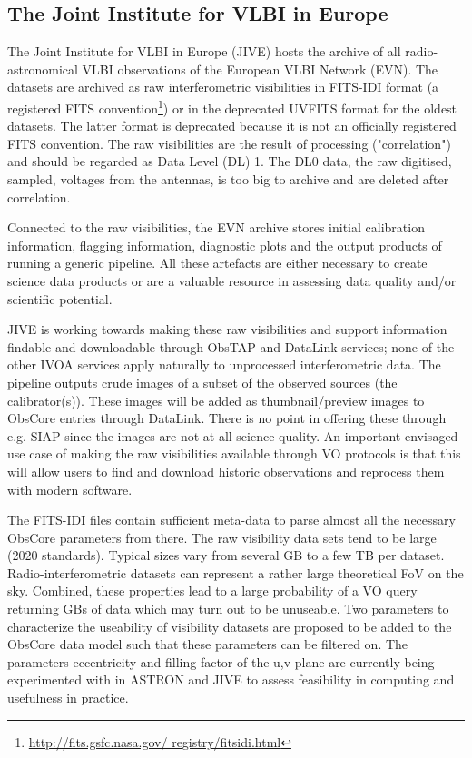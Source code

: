 \documentclass[11pt,a4paper]{ivoa}
\begin{document}
\subsection{The Joint Institute for VLBI in Europe}
\label{sec:JIVE}
The Joint Institute for VLBI in Europe (JIVE) hosts the archive of all radio-astronomical VLBI 
observations of the European VLBI Network (EVN). The datasets are archived as raw interferometric 
visibilities in FITS-IDI format (a registered FITS convention\footnote{\url{ http://fits.gsfc.nasa.gov/
registry/fitsidi.html}}) or in the deprecated UVFITS format for the oldest datasets. The latter format 
is deprecated because it is not an officially registered FITS convention. The raw visibilities are the 
result of processing ("correlation") and should be regarded as Data Level (DL) 1. The DL0 data, the raw 
digitised, sampled, voltages from the antennas, is too big to archive and are deleted after correlation.

Connected to the raw visibilities, the EVN archive stores initial calibration information, flagging 
information, diagnostic plots and the output products of running a generic pipeline. All these artefacts 
are either necessary to create science data products or are a valuable resource in assessing data 
quality and/or scientific potential.

JIVE is working towards making these raw visibilities and support information findable and downloadable 
through ObsTAP and DataLink services; none of the other IVOA services apply naturally to unprocessed 
interferometric data. The pipeline outputs crude images of a subset of the observed sources (the 
calibrator(s)). These images will be added as thumbnail/preview images to ObsCore entries through 
DataLink. There is no point in offering these through e.g. SIAP since the images are not at all science 
quality. An important envisaged use case of making the raw visibilities available through VO protocols 
is that this will allow users to find and download historic observations and reprocess them with modern 
software.

The FITS-IDI files contain sufficient meta-data to parse almost all the necessary ObsCore parameters 
from there. The raw visibility data sets tend to be large (2020 standards). Typical sizes vary from 
several GB to a few TB per dataset. Radio-interferometric datasets can represent a rather large 
theoretical FoV on the sky. Combined, these properties lead to a large probability of a VO query 
returning GBs of data which may turn out to be unuseable. Two parameters to characterize the useability 
of visibility datasets are proposed to be added to the ObsCore data model such that these parameters can 
be filtered on. The parameters eccentricity and filling factor of the u,v-plane are currently being 
experimented with in ASTRON and JIVE to assess feasibility in computing and usefulness in practice.
\end{document}
